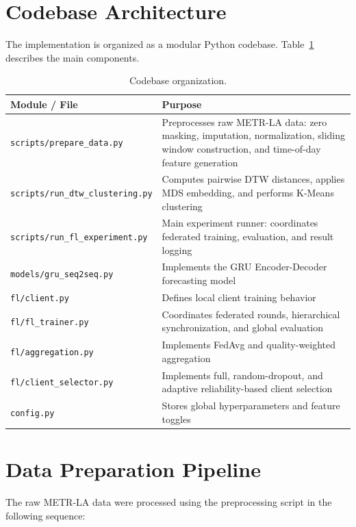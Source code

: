 \section{Codebase Architecture}
\label{sec:codebase}

The implementation is organized as a modular Python codebase. Table~\ref{tab:codebase} describes the main components.

\begin{table}[H]
\centering
\caption{Codebase organization.}
\label{tab:codebase}
\begin{tabular}{p{}p{}}
\hline
\textbf{Module / File} & \textbf{Purpose} \\
\hline
\texttt{scripts/prepare\_data.py} & Preprocesses raw METR-LA data: zero masking, imputation, normalization, sliding window construction, and time-of-day feature generation \\
\texttt{scripts/run\_dtw\_clustering.py} & Computes pairwise DTW distances, applies MDS embedding, and performs K-Means clustering \\
\texttt{scripts/run\_fl\_experiment.py} & Main experiment runner: coordinates federated training, evaluation, and result logging \\
\texttt{models/gru\_seq2seq.py} & Implements the GRU Encoder-Decoder forecasting model \\
\texttt{fl/client.py} & Defines local client training behavior \\
\texttt{fl/fl\_trainer.py} & Coordinates federated rounds, hierarchical synchronization, and global evaluation \\
\texttt{fl/aggregation.py} & Implements FedAvg and quality-weighted aggregation \\
\texttt{fl/client\_selector.py} & Implements full, random-dropout, and adaptive reliability-based client selection \\
\texttt{config.py} & Stores global hyperparameters and feature toggles \\
\hline
\end{tabular}
\end{table}

\section{Data Preparation Pipeline}
\label{sec:data_pipeline}

The raw METR-LA data were processed using the preprocessing script in the following sequence:

